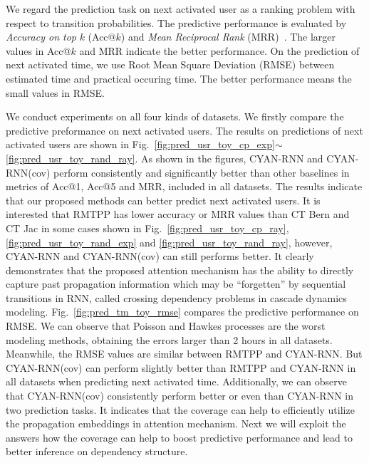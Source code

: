 We regard the prediction task on next activated user as a ranking problem
with respect to transition probabilities. The predictive performance is
evaluated by \textit{Accuracy on top} $k$ (Acc@$k$) and \textit{Mean Reciprocal Rank}
(MRR)~\cite{voorhees1999trec}.
The larger values in Acc@$k$ and MRR indicate the better performance.
On the prediction of next activated time, we use Root Mean Square Deviation
(RMSE) between estimated time and practical occuring time. The better
performance means the small values in RMSE.   

We conduct experiments on all four
kinds of datasets. 
We firstly compare the predictive preformance on
next activated users. The results on predictions of next
activated users are shown in Fig.~\ref{fig:pred_usr_toy_cp_exp}$\sim$
\ref{fig:pred_usr_toy_rand_ray}. As shown in the figures, CYAN-RNN and CYAN-RNN(cov)
perform consistently and significantly better than other baselines in metrics of
Acc@1, Acc@5 and MRR, included in all datasets. 
The results indicate that our proposed methods can better predict next activated
users. It is interested that RMTPP has lower accuracy or MRR values than CT Bern
and CT Jac in some cases shown in
Fig.~\ref{fig:pred_usr_toy_cp_ray},
\ref{fig:pred_usr_toy_rand_exp} and \ref{fig:pred_usr_toy_rand_ray}, however,
CYAN-RNN and CYAN-RNN(cov) can still performs better. It clearly demonstrates
that the proposed attention mechanism has the ability to directly capture past
propagation information which may be ``forgetten'' by sequential transitions in
RNN, called crossing dependency problems in cascade dynamics modeling.
Fig.~\ref{fig:pred_tm_toy_rmse} compares the predictive performance on RMSE.
We can observe that Poisson and Hawkes processes are the worst modeling methods,
obtaining the errors larger than 2 hours in all datasets. Meanwhile, the
RMSE values are similar between RMTPP and CYAN-RNN. But 
CYAN-RNN(cov) can perform slightly better than RMTPP and CYAN-RNN in all
datasets when predicting next activated time. 
Additionally, we can observe that CYAN-RNN(cov) consistently perform better or
even than CYAN-RNN in two prediction tasks. It indicates that the coverage can
help to efficiently utilize the propagation embeddings in attention mechanism.
Next we will exploit the answers how the coverage can help to boost predictive
performance and lead to better inference on dependency structure.

